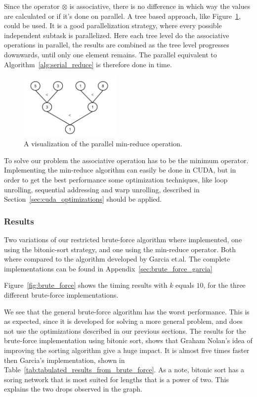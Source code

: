 Since the operator $\otimes$ is associative, there is no difference in which way the values are calculated or if it's done on parallel. A tree based approach, like Figure~\ref{fig:paralell_reduce_operation}, could be used. It is a good parallelization strategy, where every possible independent subtask is parallelized. Here each tree level do the associative operations in parallel, the results are combined as the tree level progresses downwards, until only one element remains. The parallel equivalent to Algorithm~\ref{alg:serial_reduce} is therefore done in  time. 

\begin{figure}[ht!]
\centering
\includegraphics[width=50mm]{../gfx/min_reduce.png}
\caption{A visualization of the parallel min-reduce operation.}
\label{fig:paralell_reduce_operation}
\end{figure}

To solve our problem the associative operation has to be the minimum operator. Implementing the min-reduce algorithm can easily be done in CUDA, but in order to get the best performance some optimization techniques, like loop unrolling, sequential addressing and warp unrolling, described in Section~\ref{sec:cuda_optimizations} should be applied.   

\subsubsection{Results} %
\label{ssub:comparison}

Two variations of our restricted brute-force algorithm where implemented, one using the bitonic-sort strategy, and one using the min-reduce operator. Both where compared to the algorithm developed by Garcia et.al\@. The complete implementations can be found in Appendix~\ref{sec:brute_force_garcia}

Figure~\ref{fig:brute_force} shows the timing results with $k$ equals $10$, for the three different brute-force implementations.

We see that the general brute-force algorithm has the worst performance. This is as expected, since it is developed for solving a more general problem, and does not use the optimizations described in our previous sections. The results for the brute-force implementation using bitonic sort, shows that Graham Nolan's idea of improving the sorting algorithm give a huge impact. It is almost five times faster then Garcia's implementation, shown in Table~\ref{tab:tabulated_results_from_brute_force}. As a note, bitonic sort has a soring network that is most suited for lengths that is a power of two. This explains the two drops observed in the graph.

